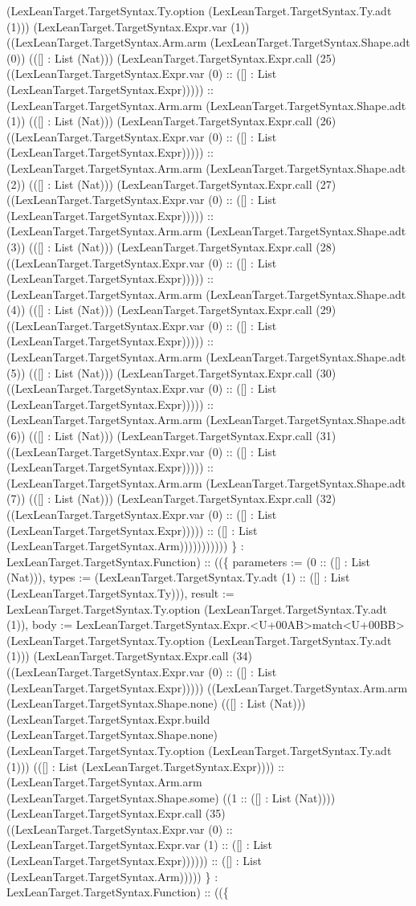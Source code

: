 \documentclass[11pt]{article}
\begin{document}
(LexLeanTarget.TargetSyntax.Ty.option (LexLeanTarget.TargetSyntax.Ty.adt (1))) (LexLeanTarget.TargetSyntax.Expr.var (1)) ((LexLeanTarget.TargetSyntax.Arm.arm (LexLeanTarget.TargetSyntax.Shape.adt (0)) (([] : List (Nat))) (LexLeanTarget.TargetSyntax.Expr.call (25) ((LexLeanTarget.TargetSyntax.Expr.var (0) :: ([] : List (LexLeanTarget.TargetSyntax.Expr))))) :: (LexLeanTarget.TargetSyntax.Arm.arm (LexLeanTarget.TargetSyntax.Shape.adt (1)) (([] : List (Nat))) (LexLeanTarget.TargetSyntax.Expr.call (26) ((LexLeanTarget.TargetSyntax.Expr.var (0) :: ([] : List (LexLeanTarget.TargetSyntax.Expr))))) :: (LexLeanTarget.TargetSyntax.Arm.arm (LexLeanTarget.TargetSyntax.Shape.adt (2)) (([] : List (Nat))) (LexLeanTarget.TargetSyntax.Expr.call (27) ((LexLeanTarget.TargetSyntax.Expr.var (0) :: ([] : List (LexLeanTarget.TargetSyntax.Expr))))) :: (LexLeanTarget.TargetSyntax.Arm.arm (LexLeanTarget.TargetSyntax.Shape.adt (3)) (([] : List (Nat))) (LexLeanTarget.TargetSyntax.Expr.call (28) ((LexLeanTarget.TargetSyntax.Expr.var (0) :: ([] : List (LexLeanTarget.TargetSyntax.Expr))))) :: (LexLeanTarget.TargetSyntax.Arm.arm (LexLeanTarget.TargetSyntax.Shape.adt (4)) (([] : List (Nat))) (LexLeanTarget.TargetSyntax.Expr.call (29) ((LexLeanTarget.TargetSyntax.Expr.var (0) :: ([] : List (LexLeanTarget.TargetSyntax.Expr))))) :: (LexLeanTarget.TargetSyntax.Arm.arm (LexLeanTarget.TargetSyntax.Shape.adt (5)) (([] : List (Nat))) (LexLeanTarget.TargetSyntax.Expr.call (30) ((LexLeanTarget.TargetSyntax.Expr.var (0) :: ([] : List (LexLeanTarget.TargetSyntax.Expr))))) :: (LexLeanTarget.TargetSyntax.Arm.arm (LexLeanTarget.TargetSyntax.Shape.adt (6)) (([] : List (Nat))) (LexLeanTarget.TargetSyntax.Expr.call (31) ((LexLeanTarget.TargetSyntax.Expr.var (0) :: ([] : List (LexLeanTarget.TargetSyntax.Expr))))) :: (LexLeanTarget.TargetSyntax.Arm.arm (LexLeanTarget.TargetSyntax.Shape.adt (7)) (([] : List (Nat))) (LexLeanTarget.TargetSyntax.Expr.call (32) ((LexLeanTarget.TargetSyntax.Expr.var (0) :: ([] : List (LexLeanTarget.TargetSyntax.Expr))))) :: ([] : List (LexLeanTarget.TargetSyntax.Arm))))))))))) \} : LexLeanTarget.TargetSyntax.Function) :: ((\{ parameters := (0 :: ([] : List (Nat))), types := (LexLeanTarget.TargetSyntax.Ty.adt (1) :: ([] : List (LexLeanTarget.TargetSyntax.Ty))), result := LexLeanTarget.TargetSyntax.Ty.option (LexLeanTarget.TargetSyntax.Ty.adt (1)), body := LexLeanTarget.TargetSyntax.Expr.<U+00AB>match<U+00BB> (LexLeanTarget.TargetSyntax.Ty.option (LexLeanTarget.TargetSyntax.Ty.adt (1))) (LexLeanTarget.TargetSyntax.Expr.call (34) ((LexLeanTarget.TargetSyntax.Expr.var (0) :: ([] : List (LexLeanTarget.TargetSyntax.Expr))))) ((LexLeanTarget.TargetSyntax.Arm.arm (LexLeanTarget.TargetSyntax.Shape.none) (([] : List (Nat))) (LexLeanTarget.TargetSyntax.Expr.build (LexLeanTarget.TargetSyntax.Shape.none) (LexLeanTarget.TargetSyntax.Ty.option (LexLeanTarget.TargetSyntax.Ty.adt (1))) (([] : List (LexLeanTarget.TargetSyntax.Expr)))) :: (LexLeanTarget.TargetSyntax.Arm.arm (LexLeanTarget.TargetSyntax.Shape.some) ((1 :: ([] : List (Nat)))) (LexLeanTarget.TargetSyntax.Expr.call (35) ((LexLeanTarget.TargetSyntax.Expr.var (0) :: (LexLeanTarget.TargetSyntax.Expr.var (1) :: ([] : List (LexLeanTarget.TargetSyntax.Expr)))))) :: ([] : List (LexLeanTarget.TargetSyntax.Arm))))) \} : LexLeanTarget.TargetSyntax.Function) :: ((\{ 
\end{document}
